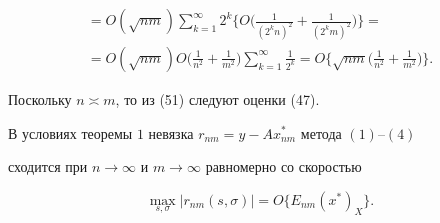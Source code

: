 \begin{pf}
\begin{multline}
% 


=O(\sqrt{nm})\sum^\infty_{k=1}2^k\bigg\{O 


\bigg(\frac{1}{(2^k n)^2}+\frac{1}{(2^k m)^2} \bigg)\bigg\}= \\ 


% 


=O(\sqrt{nm})O\bigg(\frac{1}{n^2}+\frac{1}{m^2} \bigg) 


\sum^\infty_{k=1}\frac{1}{2^k}=O\bigg\{\sqrt{nm} 


\bigg(\frac{1}{n^2}+\frac{1}{m^2} \bigg)\bigg\}.


\end{multline} 


Поскольку $n\asymp m$, то из (51) следуют оценки (47). 


\end{pf} 


 


\begin{thm} 


В условиях теоремы $1$ невязка $r_{nm}=y-Ax^*_{nm}$ метода $(1)$--$(4)$ 


сходится при $n\to\infty$ и $m\to\infty$ равномерно со скоростью 


$$ 


\max_{s,\sigma}|r_{nm}(s,\sigma)|=O\{E_{nm}(x^*)_X\}. 


$$ 


\end{thm} 


 


